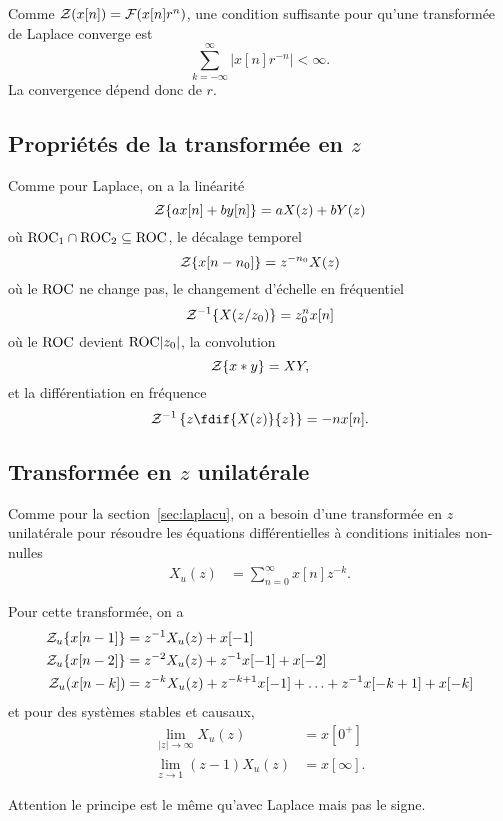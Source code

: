 Comme $\mathcal{Z}(x[n]) = \mathcal{F}(x[n]r^n)$,
une condition suffisante pour qu'une transformée de Laplace converge est
\[ \sum_{k=-\infty}^\infty|x[n]r^{-n}| < \infty. \]
La convergence dépend donc de $r$.

\subsection{Propriétés de la transformée en $z$}
Comme pour Laplace, on a la linéarité
\[ \mathcal{Z}\{ax[n]+by[n]\} = aX(z) + bY(z) \]
où $\mathrm{ROC}_1 \cap \mathrm{ROC}_2 \subseteq \mathrm{ROC}$,
le décalage temporel
\[ \mathcal{Z}\{x[n-n_0]\} = z^{-n_0}X(z) \]
où le $\mathrm{ROC}$ ne change pas,
le changement d'échelle en fréquentiel
\[ \mathcal{Z}^{-1}\{X(z/z_0)\} = z_0^nx[n] \]
où le $\mathrm{ROC}$ devient $\mathrm{ROC} |z_0|$,
la convolution
\[ \mathcal{Z}\{x*y\} = XY, \]
et la différentiation en fréquence
\[ \transfz^{-1}\left\{z\fdif{X(z)}{z}\right\} = -nx[n]. \]

\subsection{Transformée en $z$ unilatérale}
Comme pour la section~\ref{sec:laplacu}, on a besoin
d'une transformée en $z$ unilatérale pour résoudre les équations
différentielles à conditions initiales non-nulles
\begin{align*}
  X_u(z) & = \sum_{n=0}^\infty x[n] z^{-k}.
\end{align*}

Pour cette transformée, on a
\begin{align*}
  \mathcal{Z}_u\{x[n-1]\} & =
  z^{-1}X_u(z) + x[-1]\\
  \mathcal{Z}_u\{x[n-2]\} & =
  z^{-2}X_u(z) + z^{-1}x[-1] + x[-2]\\
  \mathcal{Z}_u(x[n-k]) & =
  z^{-k}X_u(z) + z^{-k+1}x[-1] + \ldots + z^{-1}x[-k+1] + x[-k]
\end{align*}
et pour des systèmes stables et causaux,
\begin{align*}
  \lim_{|z|\to\infty} X_u(z) & = x[0^+]\\
  \lim_{z\to 1} (z-1)X_u(z) & = x[\infty].
\end{align*}

Attention le principe est le même qu'avec Laplace mais pas le signe.




